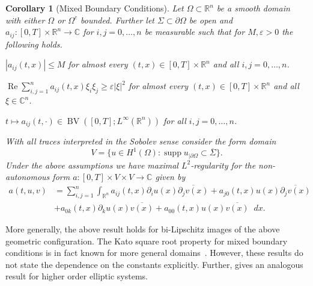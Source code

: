 \documentclass[reqno,a4paper,final]{amsart}
\numberwithin{equation}{section}
\newtheorem{corollary}[lemma]{Corollary}
\theoremstyle{definition}
\begin{document}
	\begin{corollary}[Mixed Boundary Conditions]
		Let $\Omega \subset {\mathbb{R}}^n$ be a smooth domain with either $\Omega$ or $\Omega^c$ bounded. Further let $\Sigma \subset \partial \Omega$ be open and $a_{ij}\colon [0,T] \times {\mathbb{R}}^n \to {\mathbb{C}}$ for $i, j = 0, \ldots, n$ be measurable such that for $M, {\varepsilon} > 0$ the following holds.
		\begin{thm_enum}
			\item ${\left\lvert{a_{ij}(t,x)}\right\rvert} \le M$ for almost every $(t,x) \in [0,T] \times {\mathbb{R}}^n$ and all $i,j = 0, \ldots, n$.
			\item ${\operatorname{Re}} \sum_{i,j=1}^n a_{ij}(t,x) \xi_i \xi_j \ge {\varepsilon} {\left\lvert{\xi}\right\rvert}^2$ for almost every $(t,x) \in [0,T] \times {\mathbb{R}}^n$ and all $\xi \in {\mathbb{C}}^n$.
			\item $t \mapsto a_{ij}(t,\cdot) \in \operatorname{BV}([0,T];L^{\infty}({\mathbb{R}}^n))$ for all $i,j = 0, \ldots, n$.
		\end{thm_enum}
		With all traces interpreted in the Sobolev sense consider the form domain
		\begin{equation*}
			V = \{ u \in H^1(\Omega): \operatorname{supp} u_{|\partial \Omega} \subset \overline{\Sigma} \}.
		\end{equation*}
		Under the above assumptions we have maximal $L^2$-regularity for the non-autonomous form $a\colon [0,T] \times V \times V \to {\mathbb{C}}$ given by
		\begin{align*}
			a(t,u,v) & = \sum_{i,j=1}^n \int_{{\mathbb{R}}^n} a_{ij}(t,x) \partial_i u(x) \overline{\partial_j v(x)} + a_{j0}(t,x) u(x) \overline{\partial_j v(x)} \\
			& + a_{0k}(t,x) \partial_k u(x) \overline{v(x)} + a_{00}(t,x) u(x) \overline{v(x)} {\mathop{}\!d} x.
		\end{align*}
	\end{corollary}
	
	More generally, the above result holds for bi-Lipschitz images of the above geometric configuration. The Kato square root property for mixed boundary conditions is in fact known for more general domains~\cite{EgeHalTol14}. However, these results do not state the dependence on the constants explicitly. Further, \cite[Theorem~1.3]{APM01} gives an analogous result for higher order elliptic systems.
	
\end{document}
